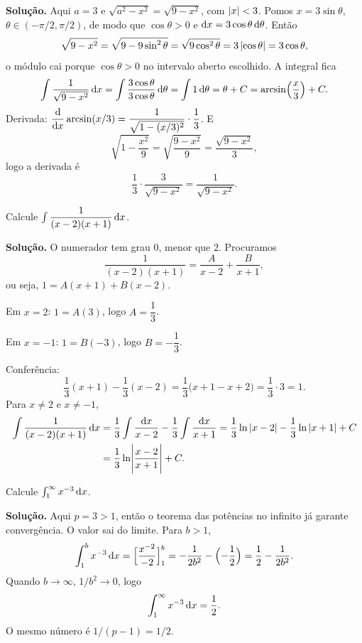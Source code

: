 \documentclass[11pt,a4paper]{article}
\begin{document}
\noindent\textbf{Solução.}
Aqui \(a=3\) e \(\sqrt{a^{2}-x^{2}}=\sqrt{9-x^{2}}\), com \(\left\lvert x \right\rvert<3\). Pomos \(x=3\sin\theta\), \(\theta\in(-\pi/2,\pi/2)\), de modo que \(\cos\theta>0\) e \(\mathrm{d} x=3\cos\theta\,\mathrm{d}\theta\). Então
\[
\sqrt{9-x^{2}}
=\sqrt{9-9\sin^{2}\theta}
=\sqrt{9\cos^{2}\theta}
=3\left\lvert \cos\theta \right\rvert
=3\cos\theta,
\]
o módulo cai porque \(\cos\theta>0\) no intervalo aberto escolhido. A integral fica
\[
\int\frac{1}{\sqrt{9-x^{2}}}\,\mathrm{d} x
=\int\frac{3\cos\theta}{3\cos\theta}\,\mathrm{d}\theta
=\int 1\,\mathrm{d}\theta
=\theta+C
=\arcsin\Bigl(\frac{x}{3}\Bigr)+C.
\]
Derivada: \(\dfrac{\mathrm{d}}{\mathrm{d} x}\arcsin(x/3)=\dfrac{1}{\sqrt{1-(x/3)^{2}}}\cdot\dfrac{1}{3}\). E
\[
\sqrt{1-\frac{x^{2}}{9}}=\sqrt{\frac{9-x^{2}}{9}}=\frac{\sqrt{9-x^{2}}}{3},
\]
logo a derivada é
\[
\frac{1}{3}\cdot\frac{3}{\sqrt{9-x^{2}}}=\frac{1}{\sqrt{9-x^{2}}}.
\]

\begin{exercicio}[Básico --- B4]
Calcule \(\int\dfrac{1}{(x-2)(x+1)}\,\mathrm{d} x\).
\end{exercicio}

\noindent\textbf{Solução.}
O numerador tem grau \(0\), menor que \(2\). Procuramos
\[
\frac{1}{(x-2)(x+1)}=\frac{A}{x-2}+\frac{B}{x+1},
\]
ou seja, \(1=A(x+1)+B(x-2)\).

Em \(x=2\): \(1=A(3)\), logo \(A=\dfrac{1}{3}\).

Em \(x=-1\): \(1=B(-3)\), logo \(B=-\dfrac{1}{3}\).

Conferência:
\[
\frac13(x+1)-\frac13(x-2)=\frac13\bigl(x+1-x+2\bigr)=\frac13\cdot 3=1.
\]
Para \(x\neq 2\) e \(x\neq -1\),
\begin{align*}
\int\frac{1}{(x-2)(x+1)}\,\mathrm{d} x
&=\frac13\int\frac{\mathrm{d} x}{x-2}-\frac13\int\frac{\mathrm{d} x}{x+1}
=\frac13\ln\left\lvert x-2 \right\rvert-\frac13\ln\left\lvert x+1 \right\rvert+C\\
&=\frac13\ln\Biggl\lvert\frac{x-2}{x+1}\Biggr\rvert+C.
\end{align*}

\begin{exercicio}[Básico --- B5]
Calcule \(\int_1^{\infty} x^{-3}\,\mathrm{d} x\).
\end{exercicio}

\noindent\textbf{Solução.}
Aqui \(p=3>1\), então o teorema das potências no infinito já garante convergência. O valor sai do limite. Para \(b>1\),
\[
\int_1^{b} x^{-3}\,\mathrm{d} x
=\Bigl[\frac{x^{-2}}{-2}\Bigr]_1^{b}
=-\frac{1}{2b^{2}}-\Bigl(-\frac{1}{2}\Bigr)
=\frac12-\frac{1}{2b^{2}}.
\]
Quando \(b\to\infty\), \(1/b^{2}\to 0\), logo
\[
\int_1^{\infty} x^{-3}\,\mathrm{d} x=\frac12.
\]
O mesmo número é \(1/(p-1)=1/2\).
\end{document}
